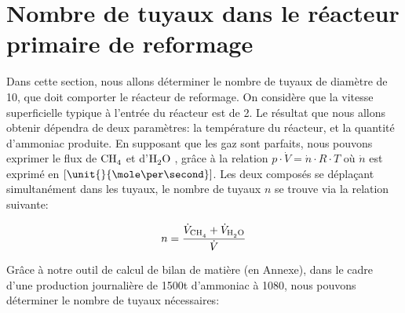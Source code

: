 
\section{Nombre de tuyaux dans le réacteur primaire de reformage}
Dans cette section, nous allons déterminer le nombre de tuyaux de diamètre de \unit{10}{\centi\meter}, que doit comporter 
le réacteur de reformage. On considère que la vitesse superficielle typique à l'entrée du réacteur est de 
\unit{2}{\meter\per\second}. Le résultat que nous allons obtenir dépendra de deux paramètres: la température du réacteur,
et la quantité d'ammoniac produite. En supposant que les gaz sont parfaits, nous pouvons exprimer le flux de $\ce{CH_4}$
et d'$\ce{H_2O}$ , grâce à la relation $p\cdot \dot{V}=\dot{n} \cdot R\cdot T$ où $\dot{n}$ est exprimé en 
$[\unit{}{\mole\per\second}]$. Les deux composés se déplaçant simultanément dans les tuyaux, le nombre de tuyaux $n$ se 
trouve via la relation suivante:

$$n = \dfrac{\dot{V}_{\ce{CH_4}} + \dot{V}_{\ce{H_2O}}}{\dot{V}}$$

Grâce à notre outil de calcul de bilan de matière (en Annexe), dans le cadre d'une production journalière de 
\unit{1500}{t} d'ammoniac à \unit{1080}{\kelvin}, nous pouvons déterminer le nombre de tuyaux nécessaires:

